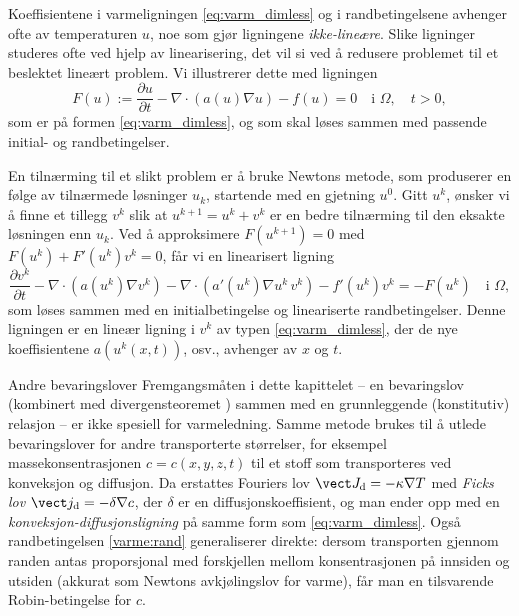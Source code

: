 Koeffisientene i varmeligningen \eqref{eq:varm_dimless} og i randbetingelsene avhenger ofte av temperaturen \( u \), noe som gjør ligningene \emph{ikke-lineære}. Slike ligninger studeres ofte ved hjelp av linearisering,  
det vil si ved å redusere problemet til et beslektet lineært problem.  
Vi illustrerer dette med ligningen
\[
F(u) := \frac{\partial u}{\partial t} - \nabla \cdot \left( a(u) \nabla u \right) - f(u) = 0 \quad \text{i } \Omega, \quad t > 0,
\]
som er på formen \eqref{eq:varm_dimless}, og som skal løses sammen med passende initial- og randbetingelser.  

En tilnærming til et slikt problem er å bruke Newtons metode, som produserer en følge av tilnærmede løsninger \( u_k \),  
startende med en gjetning \( u^0 \). Gitt \( u^k \), ønsker vi å finne et tillegg \( v^k \) slik at \( u^{k+1} = u^k + v^k \)  
er en bedre tilnærming til den eksakte løsningen enn \( u_k \).  
Ved å approksimere \( F(u^{k+1}) = 0 \) med \( F(u^k) + F'(u^k) v^k = 0 \), får vi en linearisert ligning
\[
\frac{\partial v^k}{\partial t} - \nabla \cdot \left( a(u^k) \nabla v^k \right) 
- \nabla \cdot \left( a'(u^k) \nabla u^k \, v^k \right) 
- f'(u^k) v^k = -F(u^k) \quad \text{i } \Omega,
\]
som løses sammen med en initialbetingelse og lineariserte randbetingelser.  Denne ligningen er en lineær ligning i \( v^k \) av typen \eqref{eq:varm_dimless}, der de nye koeffisientene \( a(u^k(x,t)) \), osv., avhenger av \( x \) og \( t \).

\begin{rem}{Andre bevaringslover}
Fremgangsmåten i dette kapittelet -- en bevaringslov (kombinert med divergensteoremet ) sammen med en grunnleggende (konstitutiv) relasjon -- er ikke spesiell for varmeledning. Samme metode brukes til å utlede bevaringslover for andre transporterte størrelser, for eksempel massekonsentrasjonen $c=c(x,y,z,t)$ til et stoff som transporteres ved konveksjon og diffusjon. Da erstattes Fouriers lov $\vect J_\text{d}=-\kappa\nabla T$ med \emph{Ficks lov} $\vect j_\text{d}=-\delta\nabla c$, der $\delta$ er en diffusjonskoeffisient, og man ender opp med en \emph{konveksjon-diffusjonsligning} på samme form som \eqref{eq:varm_dimless}. Også randbetingelsen \eqref{varme:rand} generaliserer direkte: dersom transporten gjennom randen antas proporsjonal med forskjellen mellom konsentrasjonen på innsiden og utsiden (akkurat som Newtons avkjølingslov for varme), får man en tilsvarende Robin-betingelse for $c$.
\end{rem}

